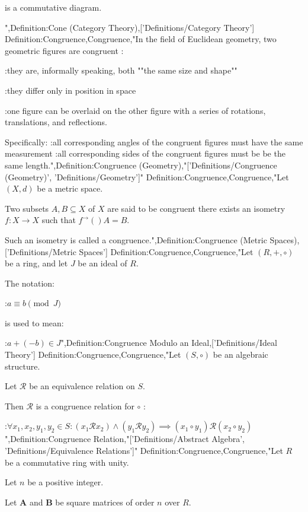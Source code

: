 is a commutative diagram.

",Definition:Cone (Category Theory),['Definitions/Category Theory']
Definition:Congruence,Congruence,"In the field of Euclidean geometry, two geometric figures are congruent :

:they are, informally speaking, both ""the same size and shape""

:they differ only in position in space

:one figure can be overlaid on the other figure with a series of rotations, translations, and reflections.


Specifically:
:all corresponding angles of the congruent figures must have the same measurement
:all corresponding sides of the congruent figures must be be the same length.",Definition:Congruence (Geometry),"['Definitions/Congruence (Geometry)', 'Definitions/Geometry']"
Definition:Congruence,Congruence,"Let $\left( X, d \right)$ be a metric space.

Two subsets $A, B \subseteq X$ of $X$ are said to be congruent  there exists an isometry $f: X \to X$ such that $f^\to \left(   \right)A = B$.

Such an isometry is called a congruence.",Definition:Congruence (Metric Spaces),['Definitions/Metric Spaces']
Definition:Congruence,Congruence,"Let $\left( R, +, \circ \right)$ be a ring, and let $J$ be an ideal of $R$.


The notation:

:$a \equiv b \pmod J$

is used to mean:

:$a + \left( -b \right) \in J$",Definition:Congruence Modulo an Ideal,['Definitions/Ideal Theory']
Definition:Congruence,Congruence,"Let $\left( S, \circ \right)$ be an algebraic structure.

Let $\mathcal R$ be an equivalence relation on $S$.


Then $\mathcal R$ is a congruence relation for $\circ$ :

:$\forall x_1, x_2, y_1, y_2 \in S: \left( x_1 \mathrel \mathcal R x_2 \right) \land \left( y_1 \mathrel \mathcal R y_2 \right) \implies \left( x_1 \circ y_1 \right) \mathrel \mathcal R \left( x_2 \circ y_2 \right)$",Definition:Congruence Relation,"['Definitions/Abstract Algebra', 'Definitions/Equivalence Relations']"
Definition:Congruence,Congruence,"Let $R$ be a commutative ring with unity.

Let $n$ be a positive integer.

Let $\mathbf A$ and $\mathbf B$ be square matrices of order $n$ over $R$.


